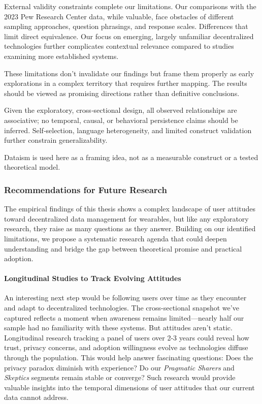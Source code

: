 	External validity constraints complete our limitations. Our comparisons with the 2023 Pew Research Center data, while valuable, face obstacles of different sampling approaches, question phrasings, and response scales. 
	Differences that limit direct equivalence. Our focus on emerging, largely unfamiliar decentralized technologies further complicates contextual relevance compared to studies examining more established systems.
	
	These limitations don't invalidate our findings but frame them properly as early explorations in a complex territory that requires further mapping. The results should be viewed as promising directions rather than definitive conclusions.

	Given the exploratory, cross‑sectional design, all observed relationships are associative; no temporal, causal, or behavioral persistence claims should be inferred. Self‑selection, language heterogeneity, and limited construct validation further constrain generalizability.

	Dataism is used here as a framing idea, not as a measurable construct or a tested theoretical model.

	\subsubsection{Recommendations for Future Research}

	The empirical findings of this thesis shows a complex landscape of user attitudes toward decentralized data management for wearables, but like any exploratory research, they raise as many questions as they answer. Building on our identified limitations, we propose a systematic research agenda that could deepen understanding and bridge the gap between theoretical promise and practical adoption.
	
	\paragraph{Longitudinal Studies to Track Evolving Attitudes}
	An interesting next step would be following users over time as they encounter and adapt to decentralized technologies. The cross-sectional snapshot we've captured reflects a moment when awareness remains limited—nearly half our sample had no familiarity with these systems. But attitudes aren't static. Longitudinal research tracking a panel of users over 2-3 years could reveal how trust, privacy concerns, and adoption willingness evolve as technologies diffuse through the population. This would help answer fascinating questions: Does the privacy paradox diminish with experience? Do our \textit{Pragmatic Sharers} and \textit{Skeptics} segments remain stable or converge? Such research would provide valuable insights into the temporal dimensions of user attitudes that our current data cannot address.
	
